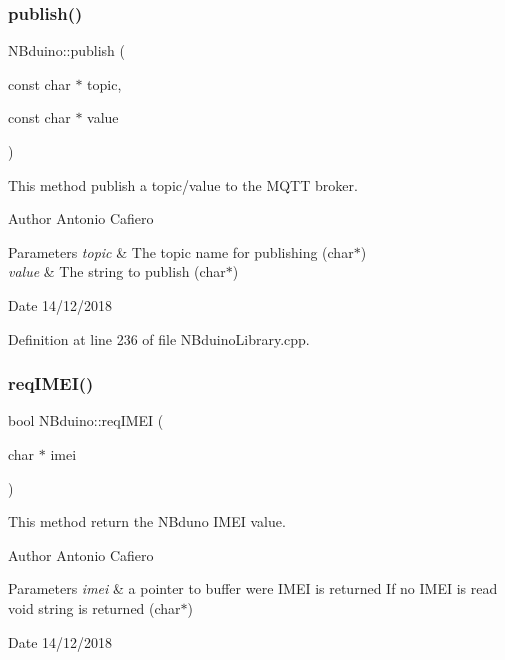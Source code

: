 \subsubsection{\texorpdfstring{publish()}{publish()}}
{\footnotesize\ttfamily N\+Bduino\+::publish (\begin{DoxyParamCaption}\item[{const char $\ast$}]{topic,  }\item[{const char $\ast$}]{value }\end{DoxyParamCaption})}

This method publish a topic/value to the M\+Q\+TT broker. \begin{DoxyAuthor}{Author}
Antonio Cafiero 
\end{DoxyAuthor}

\begin{DoxyParams}{Parameters}
{\em topic} & The topic name for publishing (char$\ast$) \\
\hline
{\em value} & The string to publish (char$\ast$) \\
\hline
\end{DoxyParams}
\begin{DoxyDate}{Date}
14/12/2018 
\end{DoxyDate}


Definition at line 236 of file N\+Bduino\+Library.\+cpp.

\mbox{\label{class_n_bduino_acb71b20e54269da260903604482f1d33}} 
\subsubsection{\texorpdfstring{req\+I\+M\+E\+I()}{reqIMEI()}}
{\footnotesize\ttfamily bool N\+Bduino\+::req\+I\+M\+EI (\begin{DoxyParamCaption}\item[{char $\ast$}]{imei }\end{DoxyParamCaption})}

This method return the N\+Bduno I\+M\+EI value. \begin{DoxyAuthor}{Author}
Antonio Cafiero 
\end{DoxyAuthor}

\begin{DoxyParams}{Parameters}
{\em imei} & a pointer to buffer were I\+M\+EI is returned If no I\+M\+EI is read void string is returned (char$\ast$) \\
\hline
\end{DoxyParams}
\begin{DoxyDate}{Date}
14/12/2018 
\end{DoxyDate}


